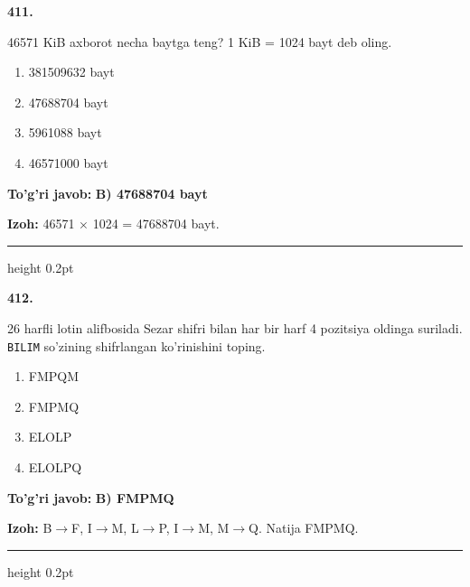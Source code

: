 \documentclass[10pt,a4paper,oneside]{article}
\begin{document}
\noindent\textbf{\color{ink}411.}
\par
46571 KiB axborot necha baytga teng? 1 KiB = 1024 bayt deb oling.
\begin{enumerate}[label=\Alph*),leftmargin=9mm]
\item 381509632 bayt
\item 47688704 bayt
\item 5961088 bayt
\item 46571000 bayt
\end{enumerate}
\begin{tcolorbox}[enhanced,breakable,colback=teal!4,colframe=teal!50!black,boxrule=0.5pt,arc=1.1mm,left=3mm,right=3mm,top=1.7mm,bottom=1.7mm,before skip=2mm,after skip=2mm]
\textbf{\color{teal}To'g'ri javob:} \textbf{B) 47688704 bayt}
\par\smallskip
\textbf{Izoh:} 46571 \ensuremath{\times} 1024 = 47688704 bayt.
\end{tcolorbox}
\vspace{2mm}\hrule height 0.2pt \vspace{3mm}

\noindent\textbf{\color{ink}412.}
\par
26 harfli lotin alifbosida Sezar shifri bilan har bir harf 4 pozitsiya oldinga suriladi. \texttt{BILIM} so'zining shifrlangan ko'rinishini toping.
\begin{enumerate}[label=\Alph*),leftmargin=9mm]
\item FMPQM
\item FMPMQ
\item ELOLP
\item ELOLPQ
\end{enumerate}
\begin{tcolorbox}[enhanced,breakable,colback=teal!4,colframe=teal!50!black,boxrule=0.5pt,arc=1.1mm,left=3mm,right=3mm,top=1.7mm,bottom=1.7mm,before skip=2mm,after skip=2mm]
\textbf{\color{teal}To'g'ri javob:} \textbf{B) FMPMQ}
\par\smallskip
\textbf{Izoh:} B\ensuremath{\to}F, I\ensuremath{\to}M, L\ensuremath{\to}P, I\ensuremath{\to}M, M\ensuremath{\to}Q. Natija FMPMQ.
\end{tcolorbox}
\vspace{2mm}\hrule height 0.2pt \vspace{3mm}
\end{document}
